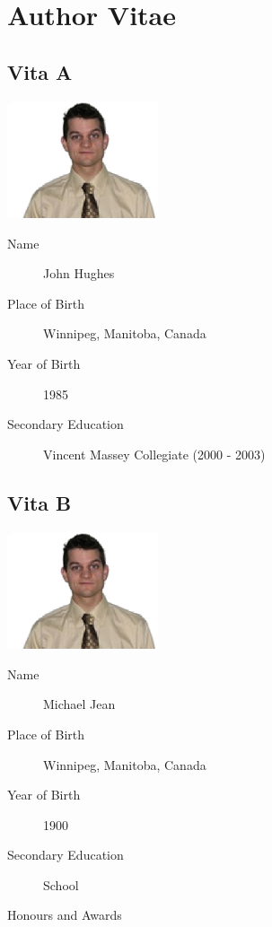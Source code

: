 \chapter{Author Vitae}

\section*{Vita A}
\includegraphics[width=1.75in,keepaspectratio]{appendicies/figures/author_john.eps}
\begin{description}
\item[Name] John Hughes
\item[Place of Birth] Winnipeg, Manitoba, Canada
\item[Year of Birth] 1985
\item[Secondary Education] Vincent Massey Collegiate (2000 - 2003)
\end{description}

\vspace{0.2in} \titlerule

\section*{Vita B}
\includegraphics[width=1.75in,keepaspectratio]{appendicies/figures/author_john.eps}
\begin{description}
\item[Name] Michael Jean
\item[Place of Birth] Winnipeg, Manitoba, Canada
\item[Year of Birth] 1900
\item[Secondary Education] School
\item[Honours and Awards]
\end{description}